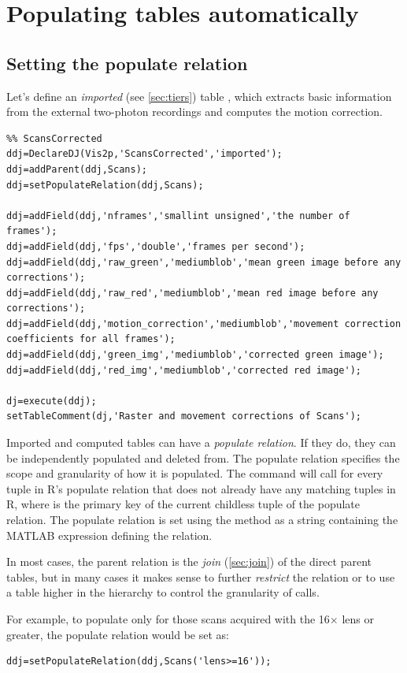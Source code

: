 \documentclass[10pt]{article}
\begin{document}
\section{Populating tables automatically}
\subsection{Setting the populate relation}
Let's define an {\em imported} (see \autoref{sec:tiers}) table , which extracts basic information from the external two-photon recordings and computes the motion correction. 
\begin{lstlisting}
%% ScansCorrected
ddj=DeclareDJ(Vis2p,'ScansCorrected','imported');
ddj=addParent(ddj,Scans);
ddj=setPopulateRelation(ddj,Scans);

ddj=addField(ddj,'nframes','smallint unsigned','the number of frames');
ddj=addField(ddj,'fps','double','frames per second');
ddj=addField(ddj,'raw_green','mediumblob','mean green image before any corrections');
ddj=addField(ddj,'raw_red','mediumblob','mean red image before any corrections');
ddj=addField(ddj,'motion_correction','mediumblob','movement correction coefficients for all frames');
ddj=addField(ddj,'green_img','mediumblob','corrected green image');
ddj=addField(ddj,'red_img','mediumblob','corrected red image');

dj=execute(ddj);
setTableComment(dj,'Raster and movement corrections of Scans');
\end{lstlisting}



Imported and computed tables can have a {\em populate relation}.  If they do, they can be independently populated and deleted from.   The populate relation specifies the scope and granularity of how it is populated. The command   will call  for every tuple in R's populate relation that does not already have any matching tuples in R, where  is the primary key of the current childless tuple of the populate relation.  The populate relation is set using the  method as a string containing the MATLAB expression defining the relation.  

In most cases, the parent relation is the {\em join} (\autoref{sec:join}) of the direct parent tables, but in many cases it makes sense to further {\em restrict} the relation or to use a table higher in the hierarchy to control the granularity of  calls.  

For example, to populate  only for those scans acquired with the 16$\times$ lens or greater, the populate relation would be set as:
\begin{lstlisting}
ddj=setPopulateRelation(ddj,Scans('lens>=16'));
\end{lstlisting}
\end{document}
